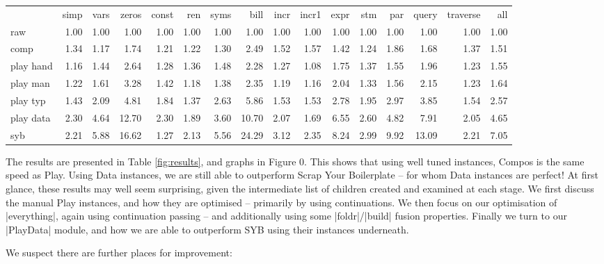 \documentclass[preprint]{sigplanconf}
\begin{document}
\begin{figure*}
\caption{Table of results.}
\label{fig:results}
\begin{tabular*}{\textwidth}{l||rrrrrrrrr||rrr||rr||r}
 & 	simp & 	vars & 	zeros & 	const & 	ren & 	syms & 	bill & 	incr & 	incr1 & 	expr & 	 stm & 	par & 	query & 	traverse & 	all \\
raw & 	1.00 & 	1.00 & 	1.00 & 	1.00 & 	1.00 & 	1.00 & 	1.00 & 	1.00 & 	1.00 & 	1.00 & 	1.00 & 	 1.00 & 	1.00 & 	1.00 & 	1.00 \\
comp & 	1.34 & 	1.17 & 	1.74 & 	1.21 & 	1.22 & 	1.30 & 	2.49 & 	1.52 & 	1.57 & 	1.42 & 	1.24 & 	 1.86 & 	1.68 & 	1.37 & 	1.51 \\
play hand & 	1.16 & 	1.44 & 	2.64 & 	1.28 & 	1.36 & 	1.48 & 	2.28 & 	1.27 & 	1.08 & 	1.75 & 	 1.37 & 	1.55 & 	1.96 & 	1.23 & 	1.55 \\
play man & 	1.22 & 	1.61 & 	3.28 & 	1.42 & 	1.18 & 	1.38 & 	2.35 & 	1.19 & 	1.16 & 	2.04 & 	1.33 & 	 1.56 & 	2.15 & 	1.23 & 	1.64 \\
play typ & 	1.43 & 	2.09 & 	4.81 & 	1.84 & 	1.37 & 	2.63 & 	5.86 & 	1.53 & 	1.53 & 	2.78 & 	1.95 & 	 2.97 & 	3.85 & 	1.54 & 	2.57 \\
play data & 	2.30 & 	4.64 & 	12.70 & 	2.30 & 	1.89 & 	3.60 & 	10.70 & 	2.07 & 	1.69 & 	 6.55 & 	2.60 & 	4.82 & 	7.91 & 	2.05 & 	4.65 \\
syb & 	2.21 & 	5.88 & 	16.62 & 	1.27 & 	2.13 & 	5.56 & 	24.29 & 	3.12 & 	2.35 & 	8.24 & 	 2.99 & 	9.92 & 	13.09 & 	2.21 & 	7.05 \\
\end{tabular*}
\end{figure*}


The results are presented in Table \ref{fig:results}, and graphs in Figure 0. This shows that using well tuned instances, Compos is the same speed as Play. Using Data instances, we are still able to outperform Scrap Your Boilerplate -- for whom Data instances are perfect! At first glance, these results may well seem surprising, given the intermediate list of children created and examined at each stage. We first discuss the manual Play instances, and how they are optimised -- primarily by using continuations. We then focus on our optimisation of |everything|, again using continuation passing -- and additionally using some |foldr|/|build| fusion properties. Finally we turn to our |PlayData| module, and how we are able to outperform SYB using their instances underneath.

We suspect there are further places for improvement:
\end{document}
